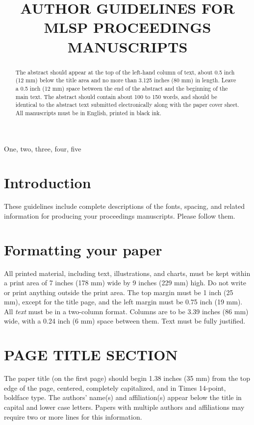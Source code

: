 \documentclass{article}
\title{AUTHOR GUIDELINES FOR MLSP PROCEEDINGS MANUSCRIPTS}
\begin{document}
%

\maketitle
%
\begin{abstract}
The abstract should appear at the top of the left-hand column of text, about
0.5 inch (12 mm) below the title area and no more than 3.125 inches (80 mm) in
length.  Leave a 0.5 inch (12 mm) space between the end of the abstract and the
beginning of the main text.  The abstract should contain about 100 to 150
words, and should be identical to the abstract text submitted electronically
along with the paper cover sheet.  All manuscripts must be in English, printed
in black ink.
\end{abstract}
%
\begin{keywords}
One, two, three, four, five
\end{keywords}
%
\section{Introduction}
\label{sec:intro}

These guidelines include complete descriptions of the fonts, spacing, and
related information for producing your proceedings manuscripts. Please follow
them.

\section{Formatting your paper}
\label{sec:format}

All printed material, including text, illustrations, and charts, must be kept
within a print area of 7 inches (178 mm) wide by 9 inches (229 mm) high. Do
not write or print anything outside the print area. The top margin must be 1
inch (25 mm), except for the title page, and the left margin must be 0.75 inch
(19 mm).  All {\it text} must be in a two-column format. Columns are to be 3.39
inches (86 mm) wide, with a 0.24 inch (6 mm) space between them. Text must be
fully justified.

\section{PAGE TITLE SECTION}
\label{sec:pagestyle}

The paper title (on the first page) should begin 1.38 inches (35 mm) from the
top edge of the page, centered, completely capitalized, and in Times 14-point,
boldface type.  The authors' name(s) and affiliation(s) appear below the title
in capital and lower case letters.  Papers with multiple authors and
affiliations may require two or more lines for this information.
\end{document}
